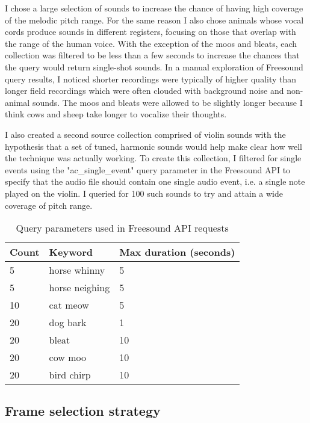 \documentclass{article}
\begin{document}
I chose a large selection of sounds to increase the chance of having high coverage of the melodic pitch range. For the same reason I also chose animals whose vocal cords produce sounds in different registers, focusing on those that overlap with the range of the human voice. With the exception of the moos and bleats, each collection was filtered to be less than a few seconds to increase the chances that the query would return single-shot sounds. In a manual exploration of Freesound query results, I noticed shorter recordings were typically of higher quality than longer field recordings which were often clouded with background noise and non-animal sounds. The moos and bleats were allowed to be slightly longer because I think cows and sheep take longer to vocalize their thoughts.

I also created a second source collection comprised of violin sounds with the hypothesis that a set of tuned, harmonic sounds would help make clear how well the technique was actually working. To create this collection, I filtered for single events using the "ac\_single\_event" query parameter in the Freesound API to specify that the audio file should contain one single audio event, i.e. a single note played on the violin. I queried for 100 such sounds to try and attain a wide coverage of pitch range.


\begin{table}
    \begin{center}
    \begin{tabular}{@{}lll@{}}
        \toprule
        Count & Keyword & Max duration (seconds) \\
        \midrule
        5 & horse whinny &  5 \\
        5 & horse neighing &  5 \\
        10 & cat meow &  5 \\
        20 & dog bark &  1 \\
        20 & bleat &  10 \\
        20 & cow moo &  10 \\
        20 & bird chirp &  10 \\
        \bottomrule
    \end{tabular}
    \end{center}
    \caption{Query parameters used in Freesound API requests}
    \label{tab:source-collection-queries}
\end{table}


\subsection{Frame selection strategy}
\end{document}
